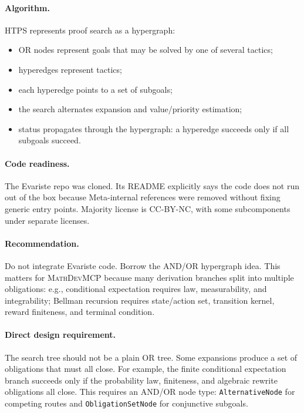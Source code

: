 \documentclass[11pt]{article}
\newcommand{\MathDevMCP}{\textsc{MathDevMCP}}
\begin{document}
\paragraph{Algorithm.}
HTPS represents proof search as a hypergraph:

\begin{itemize}[leftmargin=*]
\item OR nodes represent goals that may be solved by one of several tactics;
\item hyperedges represent tactics;
\item each hyperedge points to a set of subgoals;
\item the search alternates expansion and value/priority estimation;
\item status propagates through the hypergraph: a hyperedge succeeds only if
  all subgoals succeed.
\end{itemize}

\paragraph{Code readiness.}
The Evariste repo was cloned. Its README explicitly says the code does not run
out of the box because Meta-internal references were removed without fixing
generic entry points. Majority license is CC-BY-NC, with some subcomponents
under separate licenses.

\paragraph{Recommendation.}
Do not integrate Evariste code. Borrow the AND/OR hypergraph idea. This matters
for \MathDevMCP{} because many derivation branches split into multiple
obligations: e.g., conditional expectation requires law, measurability, and
integrability; Bellman recursion requires state/action set, transition kernel,
reward finiteness, and terminal condition.

\paragraph{Direct design requirement.}
The search tree should not be a plain OR tree. Some expansions produce a set of
obligations that must all close. For example, the finite conditional
expectation branch succeeds only if the probability law, finiteness, and
algebraic rewrite obligations all close. This requires an AND/OR node type:
\texttt{AlternativeNode} for competing routes and \texttt{ObligationSetNode}
for conjunctive subgoals.
\end{document}
